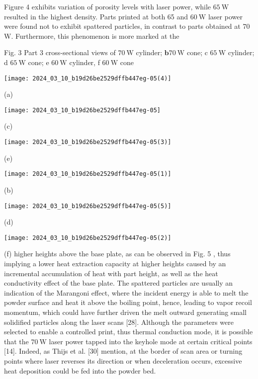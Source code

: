 \documentclass[10pt]{article}
\begin{document}
Figure 4 exhibits variation of porosity levels with laser power, while $65 \mathrm{~W}$ resulted in the highest density. Parts printed at both 65 and $60 \mathrm{~W}$ laser power were found not to exhibit spattered particles, in contrast to parts obtained at 70 W. Furthermore, this phenomenon is more marked at the

Fig. 3 Part 3 cross-sectional views of $70 \mathrm{~W}$ cylinder; $\mathbf{b} 70 \mathrm{~W}$ cone; c $65 \mathrm{~W}$ cylinder; d $65 \mathrm{~W}$ cone; e $60 \mathrm{~W}$ cylinder, f $60 \mathrm{~W}$ cone

\begin{center}
\texttt{[image: 2024\_03\_10\_b19d26be2529dffb447eg-05(4)]}
\end{center}

(a)

\begin{center}
\texttt{[image: 2024\_03\_10\_b19d26be2529dffb447eg-05]}
\end{center}

(c)

\begin{center}
\texttt{[image: 2024\_03\_10\_b19d26be2529dffb447eg-05(3)]}
\end{center}

(e)

\begin{center}
\texttt{[image: 2024\_03\_10\_b19d26be2529dffb447eg-05(1)]}
\end{center}

(b)

\begin{center}
\texttt{[image: 2024\_03\_10\_b19d26be2529dffb447eg-05(5)]}
\end{center}

(d)

\begin{center}
\texttt{[image: 2024\_03\_10\_b19d26be2529dffb447eg-05(2)]}
\end{center}

(f) higher heights above the base plate, as can be observed in Fig. 5 , thus implying a lower heat extraction capacity at higher heights caused by an incremental accumulation of heat with part height, as well as the heat conductivity effect of the base plate. The spattered particles are usually an indication of the Marangoni effect, where the incident energy is able to melt the powder surface and heat it above the boiling point, hence, leading to vapor recoil momentum, which could have further driven the melt outward generating small solidified particles along the laser scans [28]. Although the parameters were selected to enable a controlled print, thus thermal conduction mode, it is possible that the $70 \mathrm{~W}$ laser power tapped into the keyhole mode at certain critical points [14]. Indeed, as Thijs et al. [30] mention, at the border of scan area or turning points where laser reverses its direction or when deceleration occurs, excessive heat deposition could be fed into the powder bed.
\end{document}
